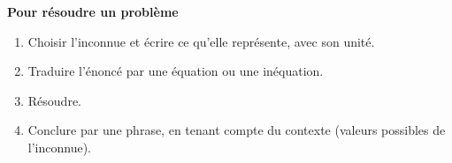 \documentclass[a4paper,11pt,fleqn]{article}
\begin{document}

\begin{tcolorbox}[colback=white, colframe=black, boxrule=0.6pt, arc=2pt, left=6pt, right=6pt, top=4pt, bottom=4pt]
\textbf{Pour résoudre un problème}
\begin{enumerate}[itemsep=0pt, topsep=2pt]
	\item Choisir l'inconnue et écrire ce qu'elle représente, avec son unité.
	\item Traduire l'énoncé par une équation ou une inéquation.
	\item Résoudre.
	\item Conclure par une phrase, en tenant compte du contexte (valeurs possibles de l'inconnue).
\end{enumerate}
\end{tcolorbox}
\end{document}
